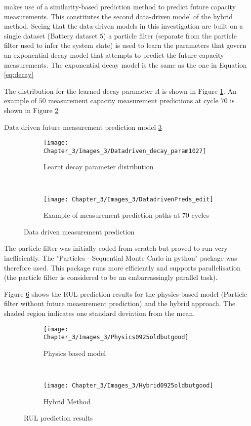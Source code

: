 \cite{Liao2016} makes use of a similarity-based prediction method to predict future capacity measurements. This constitutes the second data-driven model of the hybrid method. Seeing that the data-driven models in this investigation are built on a single dataset (Battery dataset $5$) a particle filter (separate from the particle filter used to infer the system state) is used to learn the parameters that govern an exponential decay model that attempts to predict the future capacity measurements. The exponential decay model is the same as the one in Equation \ref{eq:decay} 

The distribution for the learned decay parameter $\Lambda$ is shown in Figure \ref{F:decay}. An example of $50$ measurement capacity measurement predictions at cycle $70$ is shown in Figure \ref{F:preds}

Data driven future measurement prediction model \ref{F:Datadriven}

\begin{figure}[H]
	\centering
	\begin{subfigure}{0.49\textwidth}
		\texttt{[image: Chapter\_3/Images\_3/Datadriven\_decay\_param1027]}
		\caption{Learnt decay parameter distribution}
		\label{F:decay}
	\end{subfigure}
	~
	\begin{subfigure}{0.49\textwidth}
		\texttt{[image: Chapter\_3/Images\_3/DatadrivenPreds\_edit]}
		\caption{Example of measurement prediction paths at 70 cycles}
		\label{F:preds}
	\end{subfigure}
	
	\caption{Data driven measurement prediction}
	\label{F:Datadriven}
\end{figure}


The particle filter was initially coded from scratch but proved to run very inefficiently. The "Particles - Sequential Monte Carlo in python" package \citep{Chopin2019} was therefore used. This package runs more efficiently and supports parallelisation (the particle filter is considered to be an embarrassingly parallel task).

Figure \ref{F:Prediction} shows the RUL prediction results for the physics-based model (Particle filter without future measurement prediction) and the hybrid approach. The shaded region indicates one standard deviation from the mean.

\begin{figure}[H]
	\centering
	\begin{subfigure}{0.49\textwidth}
		\texttt{[image: Chapter\_3/Images\_3/Physics0925oldbutgood]}
		\caption{Physics based model}
		\label{F:Phys}
	\end{subfigure}
	~
	\begin{subfigure}{0.49\textwidth}
		\texttt{[image: Chapter\_3/Images\_3/Hybrid0925oldbutgood]}
		\caption{Hybrid Method}
		\label{F:Hyb}
	\end{subfigure}
	
	\caption{RUL prediction results}
	\label{F:Prediction}
\end{figure}

